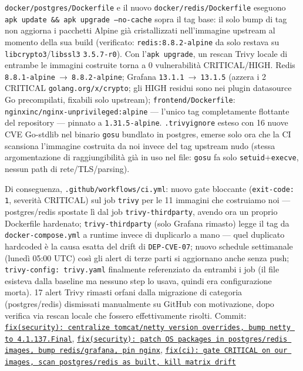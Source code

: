 ﻿\documentclass[a4paper,12pt]{report}
\newcommand{\commitref}[2]{\texttt{\small \href{https://github.com/diegoandruccioli/hotel-pms/commit/#1}{#2}}}
\begin{document}
\texttt{docker/postgres/Dockerfile} e il nuovo
\texttt{docker/redis/Dockerfile} eseguono
\texttt{apk update \&\& apk upgrade --no-cache} sopra il tag base: il solo
bump di tag non aggiorna i pacchetti Alpine già cristallizzati nell'immagine
upstream al momento della sua build (verificato: \texttt{redis:8.8.2-alpine}
da solo restava su \texttt{libcrypto3}/\texttt{libssl3} \texttt{3.5.7-r0}).
Con l'\texttt{apk upgrade}, un rescan Trivy locale di entrambe le immagini
costruite torna a 0 vulnerabilità CRITICAL/HIGH. Redis
\texttt{8.8.1-alpine}~→~\texttt{8.8.2-alpine}; Grafana
\texttt{13.1.1}~→~\texttt{13.1.5} (azzera i 2 CRITICAL
\texttt{golang.org/x/crypto}; gli HIGH residui sono nei plugin datasource Go
precompilati, fixabili solo upstream); \texttt{frontend/Dockerfile}:
\texttt{nginxinc/nginx-unprivileged:alpine} --- l'unico tag completamente
flottante del repository --- pinnato a \texttt{1.31.5-alpine}.
\texttt{.trivyignore} esteso con 16 nuove CVE Go-stdlib nel binario
\texttt{gosu} bundlato in postgres, emerse solo ora che la CI scansiona
l'immagine costruita da noi invece del tag upstream nudo (stessa
argomentazione di raggiungibilità già in uso nel file: \texttt{gosu} fa solo
\texttt{setuid}+\texttt{execve}, nessun path di rete/TLS/parsing).

Di conseguenza, \texttt{.github/workflows/ci.yml}: nuovo gate bloccante
(\texttt{exit-code: 1}, severità CRITICAL) sul job \texttt{trivy} per le 11
immagini che costruiamo noi --- postgres/redis spostate lì dal job
\texttt{trivy-thirdparty}, avendo ora un proprio Dockerfile hardenato;
\texttt{trivy-thirdparty} (solo Grafana rimasto) legge il tag da
\texttt{docker-compose.yml} a runtime invece di duplicarlo a mano --- quel
duplicato hardcoded è la causa esatta del drift di \texttt{DEP-CVE-07}; nuovo
schedule settimanale (lunedì 05:00 UTC) così gli alert di terze parti si
aggiornano anche senza push; \texttt{trivy-config: trivy.yaml} finalmente
referenziato da entrambi i job (il file esisteva dalla baseline ma nessuno
step lo usava, quindi era configurazione morta). 17 alert Trivy rimasti
orfani dalla migrazione di categoria (postgres/redis) dismissati manualmente
su GitHub con motivazione, dopo verifica via rescan locale che fossero
effettivamente risolti.
Commit: \commitref{c050521}{fix(security): centralize tomcat/netty version overrides, bump netty to 4.1.137.Final},
\commitref{2eba1cc}{fix(security): patch OS packages in postgres/redis images, bump redis/grafana, pin nginx},
\commitref{81b3f2f}{fix(ci): gate CRITICAL on our images, scan postgres/redis as built, kill matrix drift}
\end{document}
